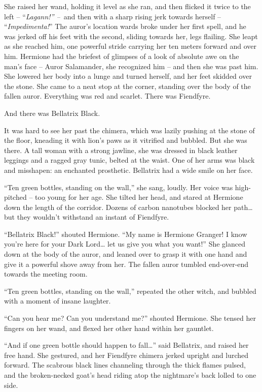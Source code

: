 She raised her wand, holding it level as she ran, and then flicked it
twice to the left -- ``\emph{Lagann!'' --}~and then with a sharp rising
jerk towards herself -- ``\emph{Impedimenta!}'' The auror's location
wards broke under her first spell, and he was jerked off his feet with
the second, sliding towards her, legs flailing. She leapt as she reached
him, one powerful stride carrying her ten meters forward and over him.
Hermione had the briefest of glimpses of a look of absolute awe on the
man's face -- Auror Salamander, she recognized him -- and then she was
past him. She lowered her body into a lunge and turned herself, and her
feet skidded over the stone. She came to a neat stop at the corner,
standing over the body of the fallen auror. Everything was red and
scarlet. There was Fiendfyre.

And there was Bellatrix Black.

It was hard to see her past the chimera, which was lazily pushing at the
stone of the floor, kneading it with lion's paws as it vitrified and
bubbled. But she was there. A tall woman with a strong jawline, she was
dressed in black leather leggings and a ragged gray tunic, belted at the
waist. One of her arms was black and misshapen: an enchanted prosthetic.
Bellatrix had a wide smile on her face.

``Ten green bottles, standing on the wall,'' she sang, loudly. Her voice
was high-pitched -- too young for her age. She tilted her head, and
stared at Hermione down the length of the corridor. Dozens of carbon
nanotubes blocked her path\ldots{} but they wouldn't withstand an
instant of Fiendfyre.

``Bellatrix Black!'' shouted Hermione. ``My name is Hermione Granger! I
know you're here for your Dark Lord\ldots{} let us give you what you
want!'' She glanced down at the body of the auror, and leaned over to
grasp it with one hand and give it a powerful shove away from her. The
fallen auror tumbled end-over-end towards the meeting room.

``Ten green bottles, standing on the wall,'' repeated the other witch,
and bubbled with a moment of insane laughter.

``Can you hear me? Can you understand me?'' shouted Hermione. She tensed
her fingers on her wand, and flexed her other hand within her gauntlet.

``And if one green bottle should happen to fall\ldots{}'' said
Bellatrix, and raised her free hand. She gestured, and her Fiendfyre
chimera jerked upright and lurched forward. The scabrous black lines
channeling through the thick flames pulsed, and the broken-necked goat's
head riding atop the nightmare's back lolled to one side.


